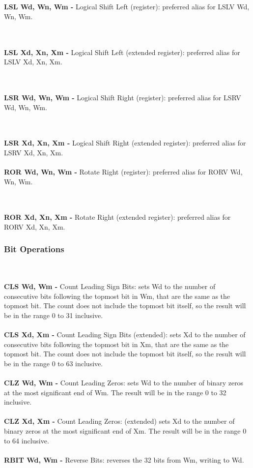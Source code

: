 \documentclass[12pt,a4paper,utf8]{ppgsi}
\begin{document}
\\\\\textbf{LSL Wd, Wn, Wm -} Logical Shift Left (register): preferred alias for LSLV Wd, Wn, Wm. 

\\\\\textbf{LSL Xd, Xn, Xm -} Logical Shift Left (extended register): preferred alias for LSLV Xd, Xn, Xm. 

\\\\\textbf{LSR Wd, Wn, Wm -} Logical Shift Right (register): preferred alias for LSRV Wd, Wn, Wm. 

\\\\\textbf{LSR Xd, Xn, Xm -} Logical Shift Right (extended register): preferred alias for LSRV Xd, Xn, Xm. 
\\\\\textbf{ROR Wd, Wn, Wm -} Rotate Right (register): preferred alias for RORV Wd, Wn, Wm. 

\\\\\textbf{ROR Xd, Xn, Xm -} Rotate Right (extended register): preferred alias for RORV Xd, Xn, Xm. 


\subsubsection{Bit Operations}

\\\\\textbf{CLS Wd, Wm -} Count Leading Sign Bits: sets Wd to the number of consecutive bits following the topmost bit in Wm, that
are the same as the topmost bit. The count does not include the topmost bit itself, so the result will be in
the range 0 to 31 inclusive.
\\\\\textbf{CLS Xd, Xm -} Count Leading Sign Bits (extended): sets Xd to the number of consecutive bits following the topmost bit
in Xm, that are the same as the topmost bit. The count does not include the topmost bit itself, so the result
will be in the range 0 to 63 inclusive. 
\\\\\textbf{CLZ Wd, Wm -} Count Leading Zeros: sets Wd to the number of binary zeros at the most significant end of Wm. The result
will be in the range 0 to 32 inclusive. 
\\\\\textbf{CLZ Xd, Xm -} Count Leading Zeros: (extended) sets Xd to the number of binary zeros at the most significant end of Xm.
The result will be in the range 0 to 64 inclusive. 
\\\\\textbf{RBIT Wd, Wm -} Reverse Bits: reverses the 32 bits from Wm, writing to Wd. 
\end{document}
